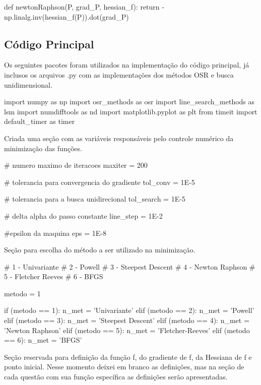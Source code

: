 \documentclass[10pt, a4paper]{article}
\begin{document}
\begin{python}
  def newtonRaphson(P, grad_P, hessian_f):
    return -np.linalg.inv(hessian_f(P)).dot(grad_P)
\end{python}

\subsection{Código Principal}

Os seguintes pacotes foram utilizados na implementação do código principal, já inclusos os arquivos .py com as implementações dos métodos OSR e busca unidimensional.

\begin{python}
  import numpy as np
  import osr_methods as osr
  import line_search_methods as lsm
  import numdifftools as nd
  import matplotlib.pyplot as plt
  from timeit import default_timer as timer
\end{python}

Criada uma seção com as variáveis responsáveis pelo controle numérico da minimização das funções.

\begin{python}
  # numero maximo de iteracoes 
  maxiter = 200

  # tolerancia para convergencia do gradiente
  tol_conv = 1E-5

  # tolerancia para a busca unidirecional
  tol_search = 1E-5

  # delta alpha do passo constante
  line_step = 1E-2

  #epsilon da maquina
  eps = 1E-8
\end{python}

Seção para escolha do método a ser utilizado na minimização.

\begin{python}
  # 1 - Univariante
  # 2 - Powell
  # 3 - Steepest Descent
  # 4 - Newton Raphson
  # 5 - Fletcher Reeves
  # 6 - BFGS

  metodo = 1

  if (metodo == 1):
      n_met = 'Univariante'
  elif (metodo == 2):
      n_met = 'Powell'
  elif (metodo == 3):
      n_met = 'Steepest Descent'
  elif (metodo == 4):
      n_met = 'Newton Raphson'
  elif (metodo == 5):
      n_met = 'Fletcher-Reeves'
  elif (metodo == 6):
      n_met = 'BFGS'
\end{python}

Seção reservada para definição da função f, do gradiente de f, da Hessiana de f e ponto inicial. Nesse momento deixei em branco as definições, mas na seção de cada 
questão com sua função específica as definições serão apresentadas.
\end{document}
